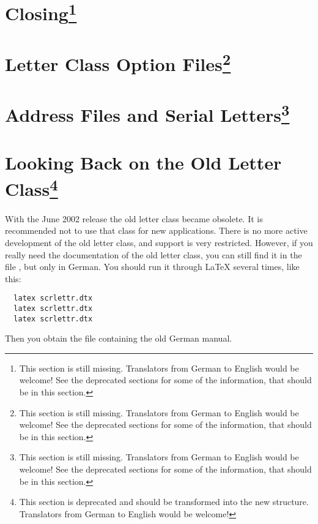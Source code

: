 \section{Closing\protect\footnote{This section is still missing. Translators
    from German to English would be welcome! See the deprecated sections for
    some of the information, that should be in this section.}}
\label{sec:scrlttr2.stillmissing}
\mbox{}

\section{Letter Class Option Files\protect\footnote{This section is still missing. Translators
    from German to English would be welcome! See the deprecated sections for
    some of the information, that should be in this section.}}
\label{sec:scrlttr2.stillmissing}
\mbox{}

\section{Address Files and Serial Letters\protect\footnote{This section is still missing. Translators
    from German to English would be welcome! See the deprecated sections for
    some of the information, that should be in this section.}}
\label{sec:scrlttr2.stillmissing}
\mbox{}


\section{Looking Back on the Old Letter Class\protect\footnote{This section is
  deprecated and should be transformed into the new structure. Translators
  from German to English would be welcome!}}
\label{sec:scrlttr2.scrlettr}

With the June 2002 release the old letter class
 became obsolete. It is
recommended not to use that class for new applications. There is no
more active development of the old letter class, and support is very
restricted. However, if you really need the documentation of the old
letter class, you can still find it in the file ,
but only in German. You should run it through {\LaTeX} several times,
like this:
\begin{lstlisting}
  latex scrlettr.dtx
  latex scrlettr.dtx
  latex scrlettr.dtx
\end{lstlisting}
Then you obtain the file  containing the old German
manual.

